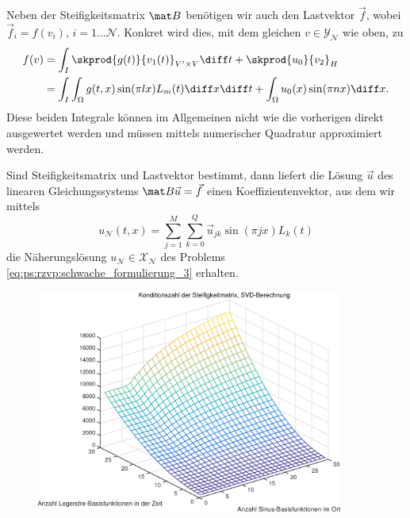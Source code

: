 Neben der Steifigkeitsmatrix $\mat B$ benötigen wir auch den Lastvektor $\vec f$, wobei $\vec f_{i} = f(v_{i})$, $i = 1 \dots \mathcal N$.
Konkret wird dies, mit dem gleichen $v \in \mathcal Y_{\mathcal N}$ wie oben, zu
\begin{align}
    f(v)
    &= \int_{I} \skprod{g(t)}{v_{1}(t)}_{V' \times V} \diff t + \skprod{u_{0}}{v_{2}}_{H}
    \\&= \int_{I} \int_{\Omega} g(t, x) \sin(\pi l x) L_{m}(t) \diff x \diff t + \int_{\Omega} u_{0}(x) \sin(\pi n x) \diff x.
\end{align}
Diese beiden Integrale können im Allgemeinen nicht wie die vorherigen direkt ausgewertet werden und müssen mittels numerischer Quadratur approximiert werden.

Sind Steifigkeitsmatrix und Lastvektor bestimmt, dann liefert die Lösung $\vec u$ des linearen Gleichungssystems $\mat B \vec u = \vec f$ einen Koeffizientenvektor, aus dem wir mittels
\begin{equation}
    u_{\mathcal N}(t, x) = \sum_{j = 1}^{M} \sum_{k = 0}^{Q} \vec u_{jk} \sin(\pi j x) L_{k}(t)
\end{equation}
die Näherungslösung $u_{\mathcal N} \in \mathcal X_{\mathcal N}$ des Problems \eqref{eq:ps:rzvp:schwache_formulierung_3} erhalten.



\clearpage
\begin{figure}[tb]
    \begin{center}
        \includegraphics[width=0.9\textwidth]{figures/oned/conds.pdf}
    \end{center}
\end{figure}

